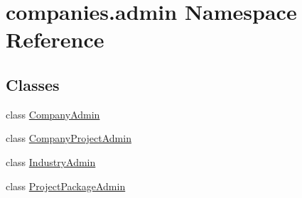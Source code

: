 \hypertarget{namespacecompanies_1_1admin}{\section{companies.\-admin Namespace Reference}
\label{namespacecompanies_1_1admin}
}
\subsection*{Classes}
\begin{DoxyCompactItemize}
\item 
class \hyperlink{classcompanies_1_1admin_1_1_company_admin}{Company\-Admin}
\item 
class \hyperlink{classcompanies_1_1admin_1_1_company_project_admin}{Company\-Project\-Admin}
\item 
class \hyperlink{classcompanies_1_1admin_1_1_industry_admin}{Industry\-Admin}
\item 
class \hyperlink{classcompanies_1_1admin_1_1_project_package_admin}{Project\-Package\-Admin}
\end{DoxyCompactItemize}

